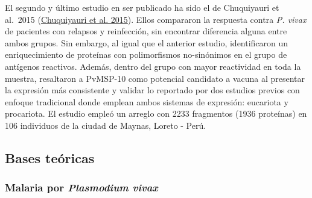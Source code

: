 \documentclass[
  a4paper]{article}
\begin{document}
\begin{enumerate}
  El segundo y último estudio en ser publicado ha sido el de Chuquiyauri
  et al.~2015 (\protect\hyperlink{ref-chuquiyauri2015vivax}{Chuquiyauri
  et al. 2015}). Ellos compararon la respuesta contra \emph{P. vivax} de
  pacientes con relapsos y reinfección, sin encontrar diferencia alguna
  entre ambos grupos. Sin embargo, al igual que el anterior estudio,
  identificaron un enriquecimiento de proteínas con polimorfismos
  no-sinónimos en el grupo de antígenos reactivos. Además, dentro del
  grupo con mayor reactividad en toda la muestra, resaltaron a PvMSP-10
  como potencial candidato a vacuna al presentar la expresión más
  consistente y validar lo reportado por dos estudios previos con
  enfoque tradicional donde emplean ambos sistemas de expresión:
  eucariota y procariota. El estudio empleó un arreglo con 2233
  fragmentos (1936 proteínas) en 106 individuos de la ciudad de Maynas,
  Loreto - Perú.
\end{enumerate}

\hypertarget{bases-teuxf3ricas}{%
\subsection{Bases teóricas}\label{bases-teuxf3ricas}}

\hypertarget{malaria-por-plasmodium-vivax}{%
\subsubsection{\texorpdfstring{Malaria por \emph{Plasmodium
vivax}}{Malaria por Plasmodium vivax}}\label{malaria-por-plasmodium-vivax}}
\end{document}
